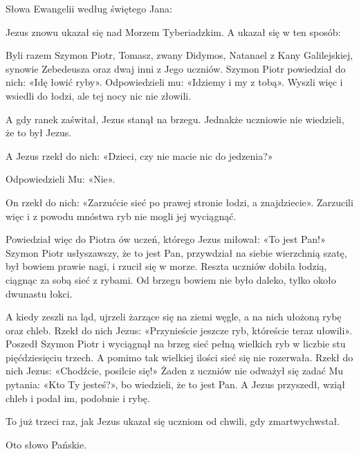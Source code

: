 \indent{} Słowa Ewangelii według świętego Jana:

Jezus znowu ukazał się nad Morzem Tyberiadzkim. A ukazał się w ten sposób:

Byli razem Szymon Piotr, Tomasz, zwany Didymos, Natanael z Kany Galilejskiej, synowie Zebedeusza oraz dwaj inni z Jego uczniów. Szymon Piotr powiedział do nich: «Idę łowić ryby». Odpowiedzieli mu: «Idziemy i my z tobą». Wyszli więc i wsiedli do łodzi, ale tej nocy nic nie złowili.

A gdy ranek zaświtał, Jezus stanął na brzegu. Jednakże uczniowie nie wiedzieli, że to był Jezus.

A Jezus rzekł do nich: «Dzieci, czy nie macie nic do jedzenia?»

Odpowiedzieli Mu: «Nie».

On rzekł do nich: «Zarzućcie sieć po prawej stronie łodzi, a znajdziecie». Zarzucili więc i z powodu mnóstwa ryb nie mogli jej wyciągnąć.

Powiedział więc do Piotra ów uczeń, którego Jezus miłował: «To jest Pan!» Szymon Piotr usłyszawszy, że to jest Pan, przywdział na siebie wierzchnią szatę, był bowiem prawie nagi, i rzucił się w morze. Reszta uczniów dobiła łodzią, ciągnąc za sobą sieć z rybami. Od brzegu bowiem nie było daleko, tylko około dwunastu łokci.

A kiedy zeszli na ląd, ujrzeli żarzące się na ziemi węgle, a na nich ułożoną rybę oraz chleb. Rzekł do nich Jezus: «Przynieście jeszcze ryb, któreście teraz ułowili». Poszedł Szymon Piotr i wyciągnął na brzeg sieć pełną wielkich ryb w liczbie stu pięćdziesięciu trzech. A pomimo tak wielkiej ilości sieć się nie rozerwała. Rzekł do nich Jezus: «Chodźcie, posilcie się!» Żaden z uczniów nie odważył się zadać Mu pytania: «Kto Ty jesteś?», bo wiedzieli, że to jest Pan. A Jezus przyszedł, wziął chleb i podał im, podobnie i rybę.

To już trzeci raz, jak Jezus ukazał się uczniom od chwili, gdy zmartwychwstał.

Oto słowo Pańskie.

